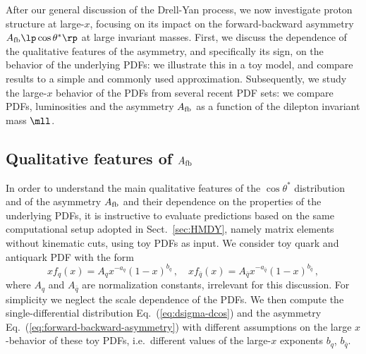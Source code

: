 
After our general discussion of the Drell-Yan process,
we now investigate
 proton structure at large-$x$, focusing on its
impact on the forward-backward asymmetry $A_{\rm fb}\lp \cos\theta^*\rp$
at large invariant masses.
%
First, we discuss the dependence of the
qualitative features of the asymmetry,
and specifically its sign, on the behavior of the underlying PDFs: we
illustrate this in a toy model, and compare results to a simple and 
commonly used approximation.
%
Subsequently,
we study the large-$x$ behavior of the PDFs from several
recent PDF sets: we compare PDFs, luminosities and the \lo asymmetry
$A_{\rm fb}$ as a function of the dilepton invariant mass $\mll$.

\subsection{Qualitative features of \texorpdfstring{$A_{\rm fb}$}{Afb}}
\label{sec:afb_toy}

In order to understand the main qualitative features of  the $\cos\theta^*$
distribution and of the asymmetry $A_{\rm fb}$ and their dependence on the 
properties of the underlying
PDFs, it is instructive to evaluate predictions based on the
same computational setup adopted in Sect.~\ref{sec:HMDY}, namely
 \lo matrix elements without kinematic cuts, using toy PDFs as input.
%
We consider toy quark and antiquark PDF with  the form
\begin{equation}
  \label{eq:toypdf}
  xf_q(x) = A_qx^{-a_q}(1-x)^{b_q} \, , \quad xf_{\bar{q}}(x) = A_{\bar{q}}x^{-a_{\bar{q}}}(1-x)^{b_{\bar{q}}} \, ,
\end{equation}
where $A_q$ and $A_{\bar{q}}$ are  normalization constants, irrelevant
for this discussion.
%
For simplicity we neglect the scale dependence of
the PDFs.
%
We then compute the single-differential distribution Eq.~(\ref{eq:dsigma-dcos}) and
the asymmetry Eq.~(\ref{eq:forward-backward-asymmetry}) with different assumptions on the
large $x$-behavior of these toy PDFs, i.e.\ different values of the large-$x$
exponents $b_q$, $b_{\bar{q}}$.

